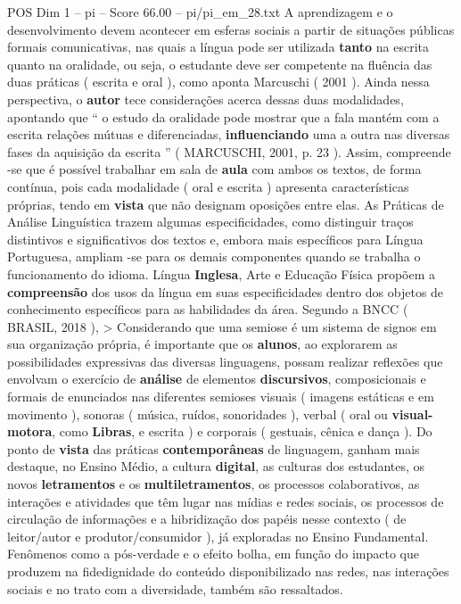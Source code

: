 \begin{textsample}{POS Dim 1 – pi – Score 66.00 – pi/pi\_em\_28.txt}
A aprendizagem e o desenvolvimento devem acontecer em esferas sociais a partir de situações públicas formais comunicativas, nas quais a língua pode ser utilizada \textbf{tanto} na escrita quanto na oralidade, ou seja, o estudante deve ser competente na fluência das duas práticas ( escrita e oral ), como aponta Marcuschi ( 2001 ).
Ainda nessa perspectiva, o \textbf{autor} tece considerações acerca dessas duas modalidades, apontando que “ o estudo da oralidade pode mostrar que a fala mantém com a escrita relações mútuas e diferenciadas, \textbf{influenciando} uma a outra nas diversas fases da aquisição da escrita ” ( MARCUSCHI, 2001, p. 23 ).
Assim, compreende -se que é possível trabalhar em sala de \textbf{aula} com ambos os textos, de forma contínua, pois cada modalidade ( oral e escrita ) apresenta características próprias, tendo em \textbf{vista} que não designam oposições entre elas.
As Práticas de Análise Linguística trazem algumas especificidades, como distinguir traços distintivos e significativos dos textos e, embora mais específicos para Língua Portuguesa, ampliam -se para os demais componentes quando se trabalha o funcionamento do idioma.
Língua \textbf{Inglesa}, Arte e Educação Física propõem a \textbf{compreensão} dos usos da língua em suas especificidades dentro dos objetos de conhecimento específicos para as habilidades da área.
Segundo a BNCC ( BRASIL, 2018 ), > Considerando que uma semiose é um sistema de signos em sua organização própria, é importante que os \textbf{alunos}, ao explorarem as possibilidades expressivas das diversas linguagens, possam realizar reflexões que envolvam o exercício de \textbf{análise} de elementos \textbf{discursivos}, composicionais e formais de enunciados nas diferentes semioses visuais ( imagens estáticas e em movimento ), sonoras ( música, ruídos, sonoridades ), verbal ( oral ou \textbf{visual-motora}, como \textbf{Libras}, e escrita ) e corporais ( gestuais, cênica e dança ).
Do ponto de \textbf{vista} das práticas \textbf{contemporâneas} de linguagem, ganham mais destaque, no Ensino Médio, a cultura \textbf{digital}, as culturas dos estudantes, os novos \textbf{letramentos} e os \textbf{multiletramentos}, os processos colaborativos, as interações e atividades que têm lugar nas mídias e redes sociais, os processos de circulação de informações e a hibridização dos papéis nesse contexto ( de leitor/autor e produtor/consumidor ), já exploradas no Ensino Fundamental.
Fenômenos como a pós-verdade e o efeito bolha, em função do impacto que produzem na fidedignidade do conteúdo disponibilizado nas redes, nas interações sociais e no trato com a diversidade, também são ressaltados.

\end{textsample}
